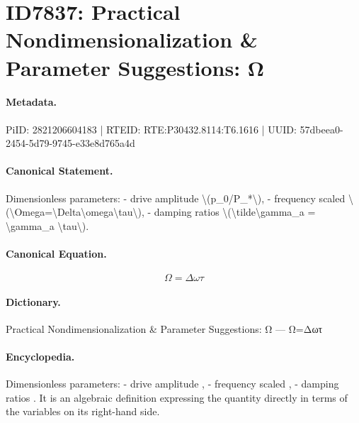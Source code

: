 \section*{ID7837: Practical Nondimensionalization \& Parameter Suggestions: Ω}
\paragraph{Metadata.}
PiID: 2821206604183 | RTEID: RTE:P30432.8114:T6.1616 | UUID: 57dbeea0-2454-5d79-9745-e33e8d765a4d

\paragraph{Canonical Statement.}
Dimensionless parameters: - drive amplitude \textbackslash{}(p\_0/P\_*\textbackslash{}), - frequency scaled \textbackslash{}(\textbackslash{}Omega=\textbackslash{}Delta\textbackslash{}omega\textbackslash{}tau\textbackslash{}), - damping ratios \textbackslash{}(\textbackslash{}tilde\textbackslash{}gamma\_a = \textbackslash{}gamma\_a \textbackslash{}tau\textbackslash{}).

\paragraph{Canonical Equation.}
\[
\Omega=\Delta\omega\tau
\]

\paragraph{Dictionary.}
Practical Nondimensionalization \& Parameter Suggestions: Ω — Ω=Δωτ

\paragraph{Encyclopedia.}
Dimensionless parameters: - drive amplitude , - frequency scaled , - damping ratios . It is an algebraic definition expressing the quantity directly in terms of the variables on its right-hand side.

